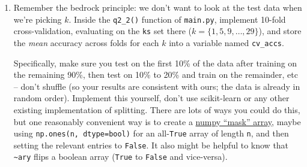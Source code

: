 \documentclass{article}
\begin{document}
\begin{enumerate}
    \item Remember the bedrock principle: we don't want to look at the test data when we're picking $k$. Inside the \texttt{q2\_2()} function of \texttt{main.py}, implement 10-fold cross-validation, evaluating on the \texttt{ks} set there ($k = \{1, 5, 9, \dots, 29\}$), and store the \emph{mean} accuracy across folds for each $k$ into a variable named \texttt{cv\_accs}.

    Specifically, make sure you test on the first 10\% of the data after training on the remaining 90\%, then test on 10\% to 20\% and train on the remainder, etc -- don't shuffle (so your results are consistent with ours; the data is already in random order). Implement this yourself, don't use scikit-learn or any other existing implementation of splitting. There are lots of ways you could do this, but one reasonably convenient way is to create a \href{https://numpy.org/doc/stable/user/basics.indexing.html#boolean-or-mask-index-arrays}{numpy ``mask'' array}, maybe using \texttt{np.ones(n, dtype=bool)} for an all-\texttt{True} array of length \texttt{n}, and then setting the relevant entries to \texttt{False}. It also might be helpful to know that \texttt{\textasciitilde ary} flips a boolean array (\texttt{True} to \texttt{False} and vice-versa).


\end{enumerate}
\end{document}
